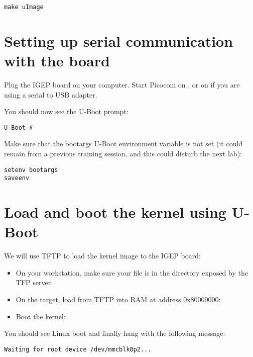 \begin{verbatim}
make uImage
\end{verbatim}

\section{Setting up serial communication with the board}

Plug the IGEP board on your computer. Start Picocom on
, or on  if you are using a serial
to USB adapter.

You should now see the U-Boot prompt:

\begin{verbatim}
U-Boot #
\end{verbatim}

Make sure that the bootargs U-Boot environment variable is not set (it
could remain from a previous training session, and this could disturb
the next lab):

\begin{verbatim}
setenv bootargs
saveenv
\end{verbatim}

\section{Load and boot the kernel using U-Boot}

We will use TFTP to load the kernel image to the IGEP board:

\begin{itemize}

\item On your workstation, make sure your  file is in the
  directory exposed by the TFP server.

\item On the target, load  from TFTP into RAM at address
  0x80000000:\\

\item Boot the kernel:\\

\end{itemize}

You should see Linux boot and finally hang with the following message:

\begin{verbatim}
Waiting for root device /dev/mmcblk0p2...
\end{verbatim}

